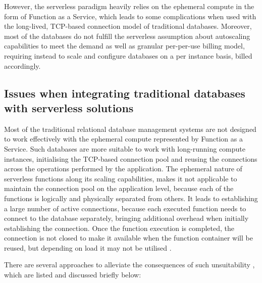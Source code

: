 However, the serverless paradigm heavily relies on the ephemeral compute in the form of Function as a Service, which leads to some complications when used with the long-lived, TCP-based connection model of traditional databases.
Moreover, most of the databases do not fulfill the serverless assumption about autoscaling capabilities to meet the demand as well as granular per-per-use billing model, requiring instead to scale and configure databases on a per instance basis, billed accordingly.

\subsection{Issues when integrating traditional databases with serverless solutions}

Most of the traditional relational database management systems are not designed to work effectively with the ephemeral compute represented by Function as a Service.
Such databases are more suitable to work with long-running compute instances, initialising the TCP-based connection pool and reusing the connections across the operations performed by the application.
The ephemeral nature of serverless functions along its scaling capabilities, makes it not applicable to maintain the connection pool on the application level, because each of the functions is logically and physically separated from others.
It leads to establishing a large number of active connections, because each executed function needs to connect to the database separately, bringing additional overhead when initially establishing the connection.
Once the function execution is completed, the connection is not closed to make it available when the function container will be reused, but depending on load it may not be utilised \cite{WhyThePIETheoremIsMoreRelevantThanTheCAPTheorem}.

There are several approaches to alleviate the consequences of such unsuitability \cite{BuildingResilientServerlessSystemsWithNonServerlessComponents}, which are listed and discussed briefly below:

